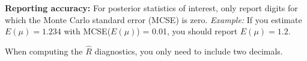 \vspace{3mm}
\textbf{Reporting accuracy:} For posterior statistics of interest, only report digits for which the Monte Carlo standard error (MCSE) is zero. \emph{Example:} If you estimate $E(\mu)=1.234$ with MCSE($E(\mu)$) = 0.01, you should report $E(\mu)=1.2$.

When computing the $\hat{R}$ diagnostics, you only need to include two decimals.

